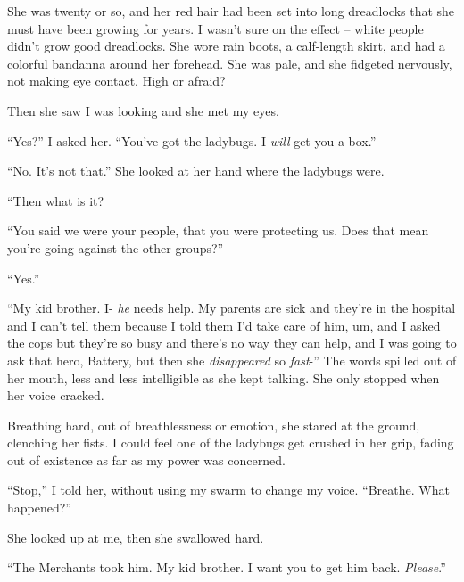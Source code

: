 She was twenty or so, and her red hair had been set into long dreadlocks that she must have been growing for years.  I wasn't sure on the effect – white people didn't grow good dreadlocks.  She wore rain boots, a calf-length skirt, and had a colorful bandanna around her forehead.  She was pale, and she fidgeted nervously, not making eye contact.  High or afraid?



Then she saw I was looking and she met my eyes.



``Yes?'' I asked her.  ``You've got the ladybugs.  I \emph{will} get you a box.''



``No.  It's not that.''  She looked at her hand where the ladybugs were.



``Then what is it?



``You said we were your people, that you were protecting us.  Does that mean you're going against the other groups?''



``Yes.''



``My kid brother.  I- \emph{he} needs help.  My parents are sick and they're in the hospital and I can't tell them because I told them I'd take care of him, um, and I asked the cops but they're so busy and there's no way they can help, and I was going to ask that hero, Battery, but then she \emph{disappeared} so \emph{fast}-''  The words spilled out of her mouth, less and less intelligible as she kept talking.  She only stopped when her voice cracked.



Breathing hard, out of breathlessness or emotion, she stared at the ground, clenching her fists.  I could feel one of the ladybugs get crushed in her grip, fading out of existence as far as my power was concerned.



``Stop,'' I told her, without using my swarm to change my voice.  ``Breathe.  What happened?''



She looked up at me, then she swallowed hard.



``The Merchants took him.  My kid brother.  I want you to get him back.  \emph{Please}.''





